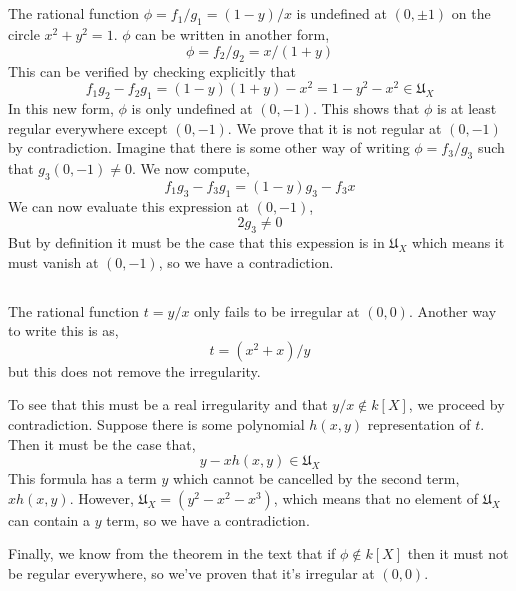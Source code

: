 \documentclass{article}
\begin{document}
\subsection{}
The rational function \(\phi = f_{1}/g_{1} = (1-y)/x\) is undefined at \((0, \pm 1)\) on the circle \(x^{2} + y^{2} = 1\). \(\phi\) can be written in another form,
\begin{equation}
\phi =  f_{2}/g_{2} = x/(1+y)
\end{equation}
This can be verified by checking explicitly that
\begin{equation}
f_{1}g_{2} - f_{2}g_{1} = (1-y)(1+y) - x^{2} = 1 - y^{2} - x^{2} \in \mathfrak{U}_{X}
\end{equation}
In this new form, \(\phi\) is only undefined at \((0,-1)\). This shows that \(\phi\) is at least regular everywhere except \((0, -1)\). We prove that it is not regular at \((0, -1)\) by contradiction. Imagine that there is some other way of writing \(\phi = f_{3}/g_{3}\) such that \(g_{3}(0, -1) \neq 0\). We now compute,
\begin{equation}
f_{1}g_{3} - f_{3}g_{1} = (1-y)g_{3} - f_{3}x
\end{equation}
We can now evaluate this expression at \((0, -1)\),
\begin{equation}
2g_{3} \neq 0
\end{equation}
But by definition it must be the case that this expession is in \(\mathfrak{U}_{X}\) which means it must vanish at \((0, -1)\), so we have a contradiction.

\subsection{}
The rational function \(t = y/x\) only fails to be irregular at \((0, 0)\). Another way to write this is as,
\begin{equation}
t = (x^{2} + x)/y
\end{equation}
but this does not remove the irregularity.

To see that this must be a real irregularity and that \(y/x \notin k[X]\), we proceed by contradiction. Suppose there is some polynomial \(h(x, y)\) representation of \(t\). Then it must be the case that,
\begin{equation}
y - xh(x, y) \in \mathfrak{U}_{X}
\end{equation} 
This formula has a term \(y\) which cannot be cancelled by the second term, \(xh(x, y)\). However, \(\mathfrak{U}_{X} = (y^{2}-x^{2}-x^{3})\), which means that no element of \(\mathfrak{U}_{X}\) can contain a \(y\) term, so we have a contradiction.

Finally, we know from the theorem in the text that if \(\phi \notin k[X]\) then it must not be regular everywhere, so we've proven that it's irregular at \((0, 0)\).
\end{document}
